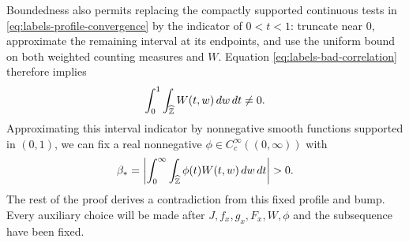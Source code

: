 Boundedness also permits replacing the compactly supported
continuous tests in \eqref{eq:labels-profile-convergence} by
the indicator of $0<t<1$: truncate near $0$, approximate the
remaining interval at its endpoints, and use the uniform bound
on both weighted counting measures and $W$.  Equation
\eqref{eq:labels-bad-correlation} therefore implies
\[
 \int_0^1\int_{\widehat{\mathbb Z}}W(t,w)\,dw\,dt\ne0.
\]
Approximating this interval indicator by nonnegative smooth
functions supported in $(0,1)$, we can fix a real nonnegative
$\phi\in C_c^\infty((0,\infty))$ with
\begin{equation}\label{eq:labels-beta}
 \beta_*=
 \left|\int_0^\infty\int_{\whZ}
             \phi(t)W(t,w)\,dw\,dt\right|>0.
\end{equation}
The rest of the proof derives a contradiction from this fixed
profile and bump.  Every auxiliary choice will be made after
$J,f_x,g_x,F_x,W,\phi$ and the subsequence have been fixed.
